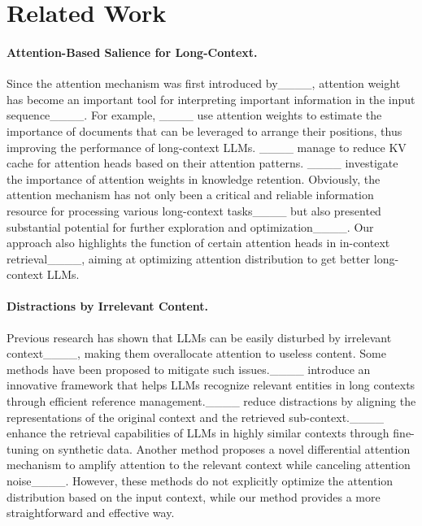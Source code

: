 \section{Related Work}
\paragraph{Attention-Based Salience for Long-Context.} Since the attention mechanism was first introduced by____, attention weight has become an important tool for interpreting important information in the input sequence____. For example, ____ use attention weights to estimate the importance of documents that can be leveraged to arrange their positions, thus improving the performance of long-context LLMs. ____ manage to reduce KV cache for attention heads based on their attention patterns. ____ investigate the importance of attention weights in knowledge retention. Obviously, the attention mechanism has not only been a critical and reliable information resource for processing various long-context tasks____ but also presented substantial potential for further exploration and optimization____. Our approach also highlights the function of certain attention heads in in-context retrieval____, aiming at optimizing attention distribution to get better long-context LLMs.

\paragraph{Distractions by Irrelevant Content.} Previous research has shown that LLMs can be easily disturbed by irrelevant context____, making them overallocate attention to useless content. Some methods have been proposed to mitigate such issues.____ introduce an innovative framework that helps LLMs recognize relevant entities in long contexts through efficient reference management.____ reduce distractions by aligning the representations of the original context and the retrieved sub-context.____ enhance the retrieval capabilities of LLMs in highly similar contexts through fine-tuning on synthetic data. Another method proposes a novel differential attention mechanism to amplify attention to the relevant context while canceling attention noise____. However, these methods do not explicitly optimize the attention distribution based on the input context, while our method provides a more straightforward and effective way.




